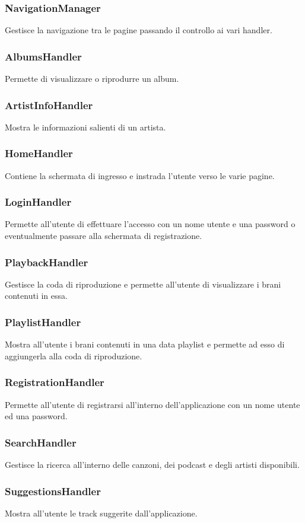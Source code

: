\documentclass{article}
\begin{document}
  \subsubsection{NavigationManager}
  Gestisce la navigazione tra le pagine passando il controllo ai vari handler.
  \subsubsection{AlbumsHandler}
  Permette di visualizzare o riprodurre un album.
  \subsubsection{ArtistInfoHandler}
  Mostra le informazioni salienti di un artista.
  \subsubsection{HomeHandler}
  Contiene la schermata di ingresso e instrada l'utente verso le varie pagine.
  \subsubsection{LoginHandler}
  Permette all'utente di effettuare l'accesso con un nome utente e una password o
  eventualmente passare alla schermata di registrazione.
  \subsubsection{PlaybackHandler}
  Gestisce la coda di riproduzione e permette all'utente di visualizzare i
  brani contenuti in essa.
  \subsubsection{PlaylistHandler}
  Mostra all'utente i brani contenuti in una data playlist e permette ad esso di
  aggiungerla alla coda di riproduzione.
  \subsubsection{RegistrationHandler}
  Permette all'utente di registrarsi all'interno dell'applicazione con un
  nome utente ed una password.
  \subsubsection{SearchHandler}
  Gestisce la ricerca all'interno delle canzoni, dei podcast e degli artisti disponibili.
  \subsubsection{SuggestionsHandler}
  Mostra all'utente le track suggerite dall'applicazione.
\end{document}
